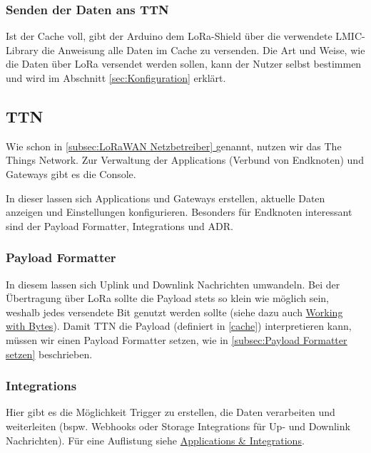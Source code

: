 \documentclass[12pt]{article}
\newcommand*{\fullref}[1]{\hyperref[{#1}]{\ref{#1} \nameref{#1}}}   %
\begin{document}
      \subsubsection{Senden der Daten ans TTN}
      Ist der Cache voll, gibt der Arduino dem LoRa-Shield über die verwendete LMIC-Library die Anweisung alle Daten im Cache zu versenden.
      Die Art und Weise, wie die Daten über LoRa versendet werden sollen, kann der Nutzer selbst bestimmen und wird im Abschnitt \underline{\ref{sec:Konfiguration}} erklärt. %


    \subsection{TTN}
      Wie schon in \underline{\fullref{subsec:LoRaWAN Netzbetreiber}} genannt, nutzen wir das The Things Network.
      Zur Verwaltung der Applications (Verbund von Endknoten) und Gateways gibt es die Console.

      In dieser lassen sich Applications und Gateways erstellen, aktuelle Daten anzeigen und Einstellungen konfigurieren.
      Besonders für Endknoten interessant sind der Payload Formatter, Integrations und ADR.


      \subsubsection{Payload Formatter}          
        In diesem lassen sich Uplink und Downlink Nachrichten umwandeln.
        Bei der Übertragung über LoRa sollte die Payload stets so klein wie möglich sein, weshalb jedes versendete Bit genutzt werden sollte
        (siehe dazu auch \href{https://www.thethingsnetwork.org/docs/devices/bytes/}{Working with Bytes}).
        Damit TTN die Payload (definiert in \underline{\ref{cache}}) interpretieren kann, müssen wir einen Payload Formatter setzen,
        wie in \underline{\ref{subsec:Payload Formatter setzen}} beschrieben.
        


      \subsubsection{Integrations}
        Hier gibt es die Möglichkeit Trigger zu erstellen, die Daten verarbeiten und weiterleiten
        (bspw. Webhooks oder Storage Integrations für Up- und Downlink Nachrichten).
        Für eine Auflistung siehe \href{https://www.thethingsnetwork.org/docs/applications-and-integrations/}{Applications \& Integrations}.
\end{document}
